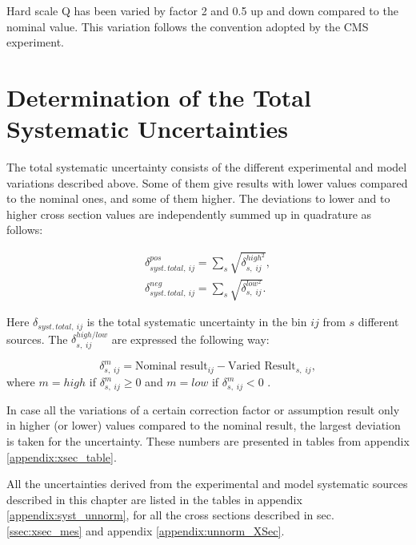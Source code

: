 Hard scale Q has been varied by factor 2 and 0.5 up and down compared to the nominal value. This variation follows the convention 
adopted by the CMS experiment.

\section{Determination of the Total Systematic Uncertainties}\label{sec:syst_det}

The total systematic uncertainty consists of the different experimental and model variations described above.
Some of them give results with lower values compared to the nominal ones, and some of them higher.
The deviations to lower and to higher cross section values are independently summed up in quadrature as follows:

\begin{align}
 \delta_{syst.\,total,\:ij}^{pos} = \sum_{s}\sqrt{\delta_{s,\;ij}^{high^{2}}}, \\
 \delta_{syst.\,total,\:ij}^{neg} = \sum_{s} \sqrt{\delta_{s,\;ij}^{low^{2}}}.
\end{align}

Here $\delta_{syst.\,total,\:ij}$ is the total systematic uncertainty in the bin $ij$ from
$s$ different sources. The $\delta_{s,\;ij}^{high/low}$ are expressed the following way:

\begin{equation}
 \delta_{s,\;ij}^{m} = \textrm{Nominal result}_{ij} - \textrm{Varied Result}_{s,\;ij}, 
\end{equation}
where $m = high$ if $\delta_{s,\;ij}^{m} \geq 0$ and $m = low$ if $\delta_{s,\;ij}^{m} < 0$ . 

In case all the variations of a certain correction factor or assumption result only in higher (or lower) values 
compared to the nominal result, the largest deviation is taken for the uncertainty. These numbers are presented
in tables from appendix \ref{appendix:xsec_table}.

All the uncertainties derived from the experimental and model systematic sources described in this chapter are listed in the tables in appendix \ref{appendix:syst_unnorm},
for all the cross sections described in sec. \ref{ssec:xsec_mes} and appendix \ref{appendix:unnorm_XSec}. 

% 

